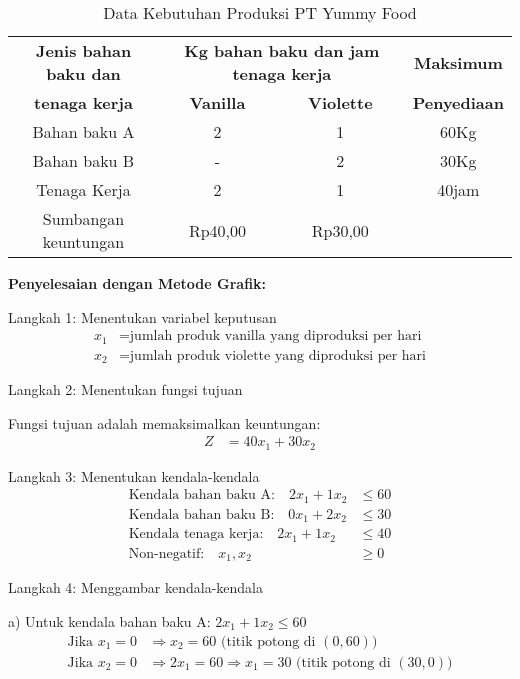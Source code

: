 \documentclass[12pt,a4paper]{article}
\begin{document}
\begin{enumerate}
    \begin{table}[H]
    \centering
    \begin{tabular}{|c|c|c|c|}
    \hline
    \textbf{Jenis bahan baku dan} & \multicolumn{2}{c|}{\textbf{Kg bahan baku dan jam tenaga kerja}} & \textbf{Maksimum} \\
    \textbf{tenaga kerja} & \textbf{Vanilla} & \textbf{Violette} & \textbf{Penyediaan} \\
    \hline
    Bahan baku A & 2 & 1 & 60Kg \\
    \hline
    Bahan baku B & - & 2 & 30Kg \\
    \hline
    Tenaga Kerja & 2 & 1 & 40jam \\
    \hline
    Sumbangan keuntungan & Rp40,00 & Rp30,00 & \\
    \hline
    \end{tabular}
    \caption{Data Kebutuhan Produksi PT Yummy Food}
    \end{table}
    
    \textbf{Penyelesaian dengan Metode Grafik:}
    
    Langkah 1: Menentukan variabel keputusan
    \begin{align*}
    x_1 &= \text{jumlah produk vanilla yang diproduksi per hari} \\
    x_2 &= \text{jumlah produk violette yang diproduksi per hari}
    \end{align*}
    
    Langkah 2: Menentukan fungsi tujuan
    
    Fungsi tujuan adalah memaksimalkan keuntungan:
    \begin{align*}
    Z &= 40x_1 + 30x_2
    \end{align*}
    
    Langkah 3: Menentukan kendala-kendala
    \begin{align*}
    \text{Kendala bahan baku A:} \quad 2x_1 + 1x_2 &\leq 60 \\
    \text{Kendala bahan baku B:} \quad 0x_1 + 2x_2 &\leq 30 \\
    \text{Kendala tenaga kerja:} \quad 2x_1 + 1x_2 &\leq 40 \\
    \text{Non-negatif:} \quad x_1, x_2 &\geq 0
    \end{align*}
    
    Langkah 4: Menggambar kendala-kendala
    
    a) Untuk kendala bahan baku A: $2x_1 + 1x_2 \leq 60$
    \begin{align*}
    \text{Jika } x_1 = 0 &\Rightarrow x_2 = 60 \text{ (titik potong di } (0,60)) \\
    \text{Jika } x_2 = 0 &\Rightarrow 2x_1 = 60 \Rightarrow x_1 = 30 \text{ (titik potong di } (30,0))
    \end{align*}
    

\end{enumerate}
\end{document}
